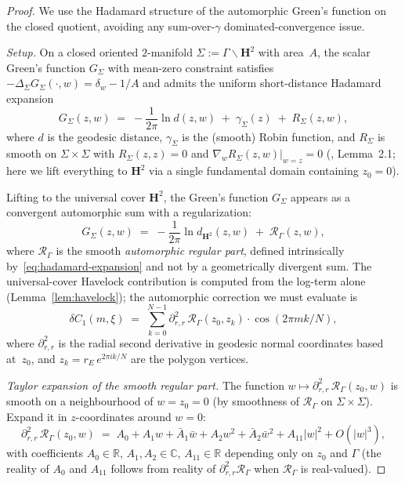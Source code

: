 \begin{proof}
We use the Hadamard structure of the automorphic Green's
function on the closed quotient, avoiding any sum-over-$\gamma$
dominated-convergence issue.

\emph{Setup.}
On a closed oriented $2$-manifold $\Sigma := \Gamma\backslash
\mathbf{H}^2$ with area~$A$, the scalar Green's function $G_\Sigma$
with mean-zero constraint satisfies $-\Delta_\Sigma G_\Sigma(\cdot, w)
= \delta_w - 1/A$ and admits the uniform short-distance Hadamard
expansion
\begin{equation}\label{eq:hadamard-expansion}
  G_\Sigma(z, w) \;=\; -\frac{1}{2\pi}\ln d(z, w)
    \;+\; \gamma_\Sigma(z)
    \;+\; R_\Sigma(z, w),
\end{equation}
where $d$ is the geodesic distance, $\gamma_\Sigma$ is the
(smooth) Robin function, and $R_\Sigma$ is smooth on $\Sigma
\times \Sigma$ with $R_\Sigma(z, z) = 0$ and
$\nabla_w R_\Sigma(z, w)|_{w=z} = 0$ (\citealt{Okikiolu2008},
Lemma~2.1; here we lift everything to $\mathbf{H}^2$ via a
single fundamental domain containing $z_0 = 0$).

Lifting to the universal cover $\mathbf{H}^2$, the Green's function
$G_\Sigma$ appears as a convergent automorphic sum with a
regularization:
\[
  G_\Sigma(z, w)
  \;=\; -\frac{1}{2\pi}\ln d_{\mathbf{H}^2}(z, w)
  \;+\; \mathcal{R}_\Gamma(z, w),
\]
where $\mathcal{R}_\Gamma$ is the smooth \emph{automorphic regular
part}, defined intrinsically by~\eqref{eq:hadamard-expansion}
and not by a geometrically divergent sum.  The universal-cover
Havelock contribution is computed from the log-term alone
(Lemma~\ref{lem:havelock}); the automorphic correction we must
evaluate is
\begin{equation}\label{eq:delta-C1-smooth}
  \delta C_1(m, \xi)
  \;=\; \sum_{k=0}^{N-1}
    \partial_{r,r}^2\, \mathcal{R}_\Gamma(z_0, z_k)
  \cdot \cos(2\pi m k/N),
\end{equation}
where $\partial_{r,r}^2$ is the radial second derivative in
geodesic normal coordinates based at~$z_0$, and $z_k = r_E\,
e^{2\pi ik/N}$ are the polygon vertices.

\emph{Taylor expansion of the smooth regular part.}
The function $w \mapsto \partial_{r,r}^2\,\mathcal{R}_\Gamma(z_0, w)$
is smooth on a neighbourhood of $w = z_0 = 0$ (by smoothness of
$\mathcal{R}_\Gamma$ on $\Sigma \times \Sigma$).  Expand it in
$z$-coordinates around $w = 0$:
\begin{equation}\label{eq:R-taylor}
  \partial_{r,r}^2\,\mathcal{R}_\Gamma(z_0, w)
  \;=\; A_0 + A_1 w + \bar A_1 \bar w
    + A_2 w^2 + \bar A_2 \bar w^2 + A_{11} |w|^2
    + O(|w|^3),
\end{equation}
with coefficients $A_0 \in \mathbb{R}$,
$A_1, A_2 \in \mathbb{C}$, $A_{11} \in \mathbb{R}$ depending
only on $z_0$ and $\Gamma$ (the reality of $A_0$ and $A_{11}$
follows from reality of $\partial_{r,r}^2 \mathcal{R}_\Gamma$
when $\mathcal{R}_\Gamma$ is real-valued).


\end{proof}
